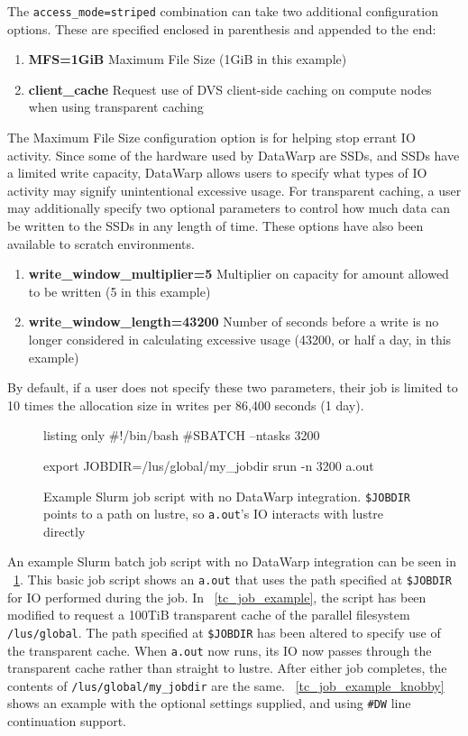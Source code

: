 \documentclass[10pt, conference, compsocconf]{IEEEtran}
\begin{document}
The \texttt{access\_mode=striped} combination can take two additional configuration options.  These are specified enclosed in parenthesis and appended to the end:
\begin{enumerate}
\item \textbf{MFS=1GiB} Maximum File Size (1GiB in this example)
\item \textbf{client\_cache} Request use of DVS client-side caching on compute nodes when using transparent caching~\cite{dvs_client_cache}
\end{enumerate}

The Maximum File Size configuration option is for helping stop errant IO activity.  Since some of the hardware used by DataWarp are SSDs, and SSDs have a limited write capacity, DataWarp allows users to specify what types of IO activity may signify unintentional excessive usage.  For transparent caching, a user may additionally specify two optional parameters to control how much data can be written to the SSDs in any length of time.  These options have also been available to scratch environments.
\begin{enumerate}
\item \textbf{write\_window\_multiplier=5} Multiplier on capacity for amount allowed to be written (5 in this example)
\item \textbf{write\_window\_length=43200} Number of seconds before a write is no longer considered in calculating excessive usage (43200, or half a day, in this example)
\end{enumerate}
By default, if a user does not specify these two parameters, their job is limited to 10 times the allocation size in writes per 86,400 seconds (1 day).

\begin{figure}
\small
\begin{tcblisting}{listing only}
#!/bin/bash
#SBATCH --ntasks 3200

export JOBDIR=/lus/global/my_jobdir
srun -n 3200 a.out
\end{tcblisting}
\caption{Example Slurm job script with no DataWarp integration.  \texttt{\$JOBDIR} points to a path on lustre, so \texttt{a.out}'s IO interacts with lustre directly\label{slurm_job_example}}
\end{figure}

An example Slurm batch job script with no DataWarp integration can be seen in \figurename~\ref{slurm_job_example}.  This basic job script shows an \texttt{a.out} that uses the path specified at \texttt{\$JOBDIR} for IO performed during the job.  In \figurename~\ref{tc_job_example}, the script has been modified to request a 100TiB transparent cache of the parallel filesystem \texttt{/lus/global}.  The path specified at \texttt{\$JOBDIR} has been altered to specify use of the transparent cache.  When \texttt{a.out} now runs, its IO now passes through the transparent cache rather than straight to lustre.  After either job completes, the contents of \texttt{/lus/global/my\_jobdir} are the same.  \figurename~\ref{tc_job_example_knobby} shows an example with the optional settings supplied, and using \texttt{\#DW} line continuation support.
\end{document}
